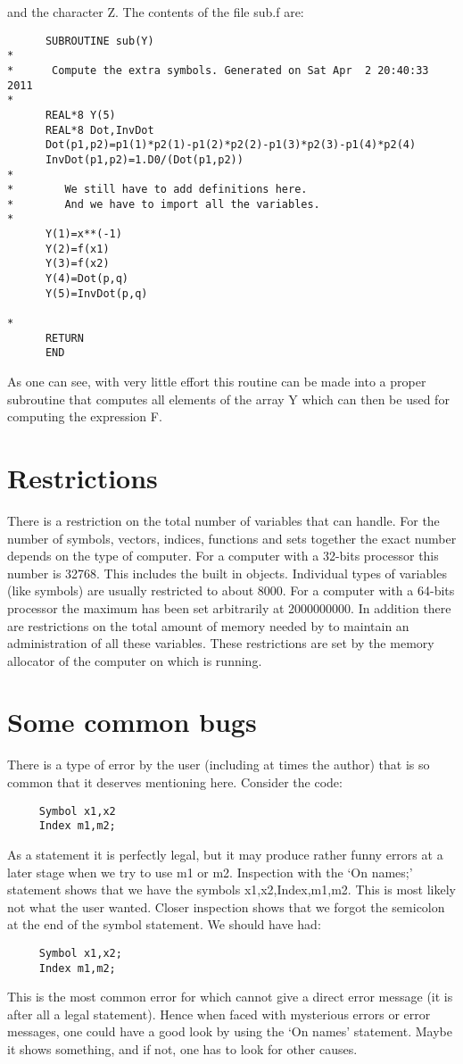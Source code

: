 and the character Z. The contents of the file sub.f are:
\begin{verbatim}
      SUBROUTINE sub(Y)
*
*      Compute the extra symbols. Generated on Sat Apr  2 20:40:33 2011
*
      REAL*8 Y(5)
      REAL*8 Dot,InvDot
      Dot(p1,p2)=p1(1)*p2(1)-p1(2)*p2(2)-p1(3)*p2(3)-p1(4)*p2(4)
      InvDot(p1,p2)=1.D0/(Dot(p1,p2))
*
*        We still have to add definitions here.
*        And we have to import all the variables.
*
      Y(1)=x**(-1)
      Y(2)=f(x1)
      Y(3)=f(x2)
      Y(4)=Dot(p,q)
      Y(5)=InvDot(p,q)

*
      RETURN
      END
\end{verbatim}
As one can see, with very little effort this routine can be made into a 
proper subroutine that computes all elements of the array Y which can then 
be used for computing the expression F.


\section{Restrictions}

There is a restriction on the total number of 
variables that {\FORM} can handle. For the 
number of symbols, vectors, indices, functions and sets together the exact 
number depends on the type of computer. For a computer with a 32-bits 
processor this number is 32768. This includes the built in objects. 
Individual types of variables (like symbols) are usually restricted to 
about 8000. For a 
computer with a 64-bits processor the maximum has been set arbitrarily at 
2000000000. In addition there are restrictions on the total amount of 
memory needed by {\FORM} to maintain an 
administration of all these variables. These restrictions are set by the 
memory allocator of the computer on which {\FORM} is running.

\section{Some common bugs}

There is a type of error by the user (including at 
times the author) that is so common that it deserves mentioning here. 
Consider the code:
\begin{verbatim}
     Symbol x1,x2
     Index m1,m2;
\end{verbatim}
As a statement it is perfectly legal, but it may produce 
rather funny errors at a later stage when we try to use m1 or m2. 
Inspection with the `On names;' statement shows that we have the symbols 
x1,x2,Index,m1,m2. This is most likely not what the user wanted. Closer 
inspection shows that we forgot the semicolon at the end of the symbol 
statement. We should have had:
\begin{verbatim}
     Symbol x1,x2;
     Index m1,m2;
\end{verbatim}
This is the most common error for which {\FORM} cannot give a direct error 
message (it is after all a legal statement). Hence when faced with 
mysterious errors or error messages, one could have a good look by using 
the `On names' statement. Maybe it shows something, and if not, one has to 
look for other causes.
